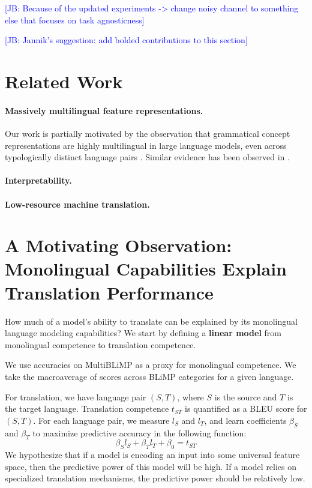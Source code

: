 \documentclass[11pt]{article}
\newcommand{\jb}[1]{\textcolor{blue}{[JB: #1]}}
\begin{document}
\jb{Because of the updated experiments -> change noisy channel to something else that focuses on task agnosticness}

\jb{Jannik's suggestion: add bolded contributions to this section}

\section{Related Work}
\paragraph{Massively multilingual feature representations.} Our work is partially motivated by the observation that grammatical concept representations are highly multilingual in large language models, even across typologically distinct language pairs \citep{brinkmann-etal-2025-large}. Similar evidence has been observed in \citep{wendler-etal-2024-llamas,dumas-etal-2025-separating}.

\paragraph{Interpretability.}

\paragraph{Low-resource machine translation.} 

\section{A Motivating Observation: Monolingual Capabilities Explain Translation Performance}
How much of a model's ability to translate can be explained by its monolingual language modeling capabilities? We start by defining a \textbf{linear model} from monolingual competence to translation competence.

We use accuracies on MultiBLiMP as a proxy for monolingual competence. We take the macroaverage of scores across BLiMP categories for a given language.

For translation, we have language pair $(S, T)$, where $S$ is the source and $T$ is the target language. Translation competence $t_{ST}$ is quantified as a BLEU score for $(S, T)$. For each language pair, we measure $l_S$ and $l_T$, and learn coefficients $\beta_S$ and $\beta_T$ to maximize predictive accuracy in the following function:
\begin{equation}
    \beta_S l_S + \beta_Tl_T + \beta_0 = t_{ST}
\end{equation}
We hypothesize that if a model is encoding an input into some universal feature space, then the predictive power of this model will be high. If a model relies on specialized translation mechanisms, the predictive power should be relatively low.
\end{document}
